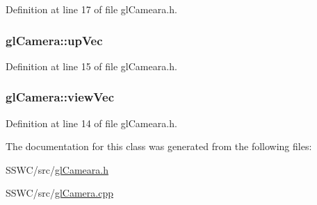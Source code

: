 Definition at line 17 of file gl\+Cameara.\+h.

\hypertarget{classgl_camera_a361375f29cfc87acae069ec5b45f56f4}{
\subsubsection[{up\+Vec}]{ gl\+Camera\+::up\+Vec}}\label{classgl_camera_a361375f29cfc87acae069ec5b45f56f4}


Definition at line 15 of file gl\+Cameara.\+h.

\hypertarget{classgl_camera_a2d6263fab021ec81f9f13582f8bdcb9b}{
\subsubsection[{view\+Vec}]{ gl\+Camera\+::view\+Vec}}\label{classgl_camera_a2d6263fab021ec81f9f13582f8bdcb9b}


Definition at line 14 of file gl\+Cameara.\+h.



The documentation for this class was generated from the following files\+:\begin{DoxyCompactItemize}
\item 
S\+S\+W\+C/src/\hyperlink{gl_cameara_8h}{gl\+Cameara.\+h}\item 
S\+S\+W\+C/src/\hyperlink{gl_camera_8cpp}{gl\+Camera.\+cpp}\end{DoxyCompactItemize}
